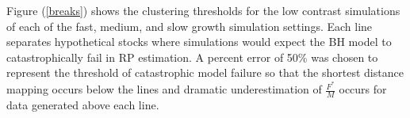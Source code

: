 %
%

Figure (\ref{breaks}) shows the clustering thresholds for the low contrast
simulations of each of the fast, medium, and slow growth simulation settings.
Each line separates hypothetical stocks where simulations would expect the BH model %
to catastrophically fail in RP estimation. %
A percent error of 50\% was chosen to represent the threshold of catastrophic model failure so that the shortest 
distance mapping occurs below the lines and dramatic underestimation of $\frac{F^*}{M}$ occurs for data generated
above each line.

